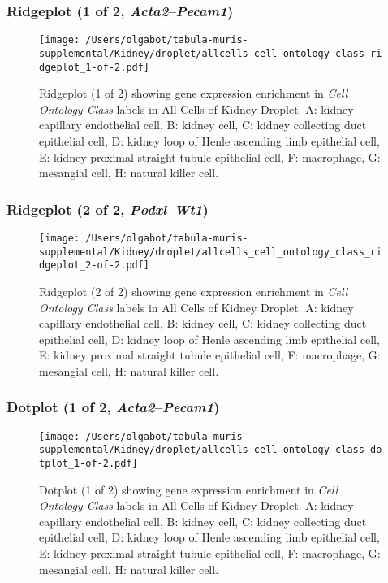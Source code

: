 \clearpage

\subsubsection{Ridgeplot (1 of 2, \emph{Acta2}--\emph{Pecam1})}
\begin{figure}[h]
\centering
\texttt{[image: /Users/olgabot/tabula-muris-supplemental/Kidney/droplet/allcells\_cell\_ontology\_class\_ridgeplot\_1-of-2.pdf]}

\caption{ Ridgeplot (1 of 2)  showing gene expression enrichment in \emph{Cell Ontology Class} labels in All Cells of Kidney Droplet. A: kidney capillary endothelial cell, B: kidney cell, C: kidney collecting duct epithelial cell, D: kidney loop of Henle ascending limb epithelial cell, E: kidney proximal straight tubule epithelial cell, F: macrophage, G: mesangial cell, H: natural killer cell.}
\end{figure}


\clearpage

\subsubsection{Ridgeplot (2 of 2, \emph{Podxl}--\emph{Wt1})}
\begin{figure}[h]
\centering
\texttt{[image: /Users/olgabot/tabula-muris-supplemental/Kidney/droplet/allcells\_cell\_ontology\_class\_ridgeplot\_2-of-2.pdf]}

\caption{ Ridgeplot (2 of 2)  showing gene expression enrichment in \emph{Cell Ontology Class} labels in All Cells of Kidney Droplet. A: kidney capillary endothelial cell, B: kidney cell, C: kidney collecting duct epithelial cell, D: kidney loop of Henle ascending limb epithelial cell, E: kidney proximal straight tubule epithelial cell, F: macrophage, G: mesangial cell, H: natural killer cell.}
\end{figure}


\clearpage

\subsubsection{Dotplot (1 of 2, \emph{Acta2}--\emph{Pecam1})}
\begin{figure}[h]
\centering
\texttt{[image: /Users/olgabot/tabula-muris-supplemental/Kidney/droplet/allcells\_cell\_ontology\_class\_dotplot\_1-of-2.pdf]}

\caption{ Dotplot (1 of 2)  showing gene expression enrichment in \emph{Cell Ontology Class} labels in All Cells of Kidney Droplet. A: kidney capillary endothelial cell, B: kidney cell, C: kidney collecting duct epithelial cell, D: kidney loop of Henle ascending limb epithelial cell, E: kidney proximal straight tubule epithelial cell, F: macrophage, G: mesangial cell, H: natural killer cell.}
\end{figure}


